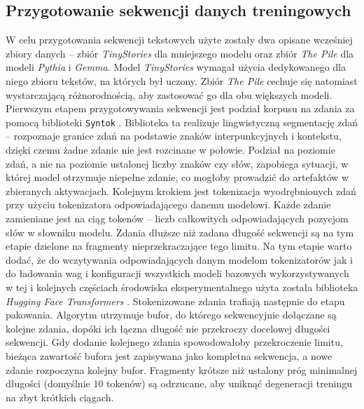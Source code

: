   \subsection{Przygotowanie sekwencji danych treningowych}
  \label{sec:przygotowanie_sekwencji}
  W celu przygotowania sekwencji tekstowych użyte zostały dwa opisane wcześniej zbiory danych -- zbiór \textit{TinyStories} dla mniejszego modelu oraz zbiór \textit{The Pile} dla modeli \textit{Pythia} i \textit{Gemma}. Model \textit{TinyStories} wymagał użycia dedykowanego dla niego zbioru tekstów, na których był uczony. Zbiór \textit{The Pile} cechuje się natomiast wystarczającą różnorodnością, aby zastosować go dla obu większych modeli. \newline
  Pierwszym etapem przygotowywania sekwencji jest podział korpusu na zdania za pomocą biblioteki \texttt{Syntok} \cite{leitner_syntok_2022}. Biblioteka ta realizuje lingwistyczną segmentację zdań -- rozpoznaje granice zdań na podstawie znaków interpunkcyjnych i kontekstu, dzięki czemu żadne zdanie nie jest rozcinane w połowie. Podział na poziomie zdań, a nie na poziomie ustalonej liczby znaków czy słów, zapobiega sytuacji, w której model otrzymuje niepełne zdanie, co mogłoby prowadzić do artefaktów w zbieranych aktywacjach. \newline
  Kolejnym krokiem jest tokenizacja wyodrębnionych zdań przy użyciu tokenizatora odpowiadającego danemu modelowi. Każde zdanie zamieniane jest na ciąg tokenów -- liczb całkowitych odpowiadających pozycjom słów w słowniku modelu. Zdania dłuższe niż zadana długość sekwencji są na tym etapie dzielone na fragmenty nieprzekraczające tego limitu. \newline
  Na tym etapie warto dodać, że do wczytywania odpowiadających danym modelom tokenizatorów jak i do ładowania wag i konfiguracji wszystkich modeli bazowych wykorzystywanych w tej i kolejnych częściach środowiska eksperymentalnego użyta została biblioteka \textit{Hugging Face Transformers} \cite{wolf_2020_huggingfaces_transformers_state_of_the_art_natural}. \newline
  Stokenizowane zdania trafiają następnie do etapu pakowania. Algorytm utrzymuje bufor, do którego sekwencyjnie dołączane są kolejne zdania, dopóki ich łączna długość nie przekroczy docelowej długości sekwencji. Gdy dodanie kolejnego zdania spowodowałoby przekroczenie limitu, bieżąca zawartość bufora jest zapisywana jako kompletna sekwencja, a nowe zdanie rozpoczyna kolejny bufor. Fragmenty krótsze niż ustalony próg minimalnej długości (domyślnie $10$ tokenów) są odrzucane, aby uniknąć degeneracji treningu na zbyt krótkich ciągach. \newline
